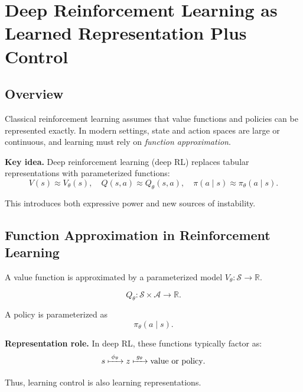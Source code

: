 \section{Deep Reinforcement Learning as Learned Representation Plus Control}

\subsection{Overview}

Classical reinforcement learning assumes that value functions and policies can be represented exactly.  
In modern settings, state and action spaces are large or continuous, and learning must rely on \emph{function approximation}.

\medskip

\noindent
\textbf{Key idea.}  
Deep reinforcement learning (deep RL) replaces tabular representations with parameterized functions:
\[
V(s) \approx V_\theta(s), \quad Q(s,a) \approx Q_\theta(s,a), \quad \pi(a \mid s) \approx \pi_\theta(a \mid s).
\]

\medskip

This introduces both expressive power and new sources of instability.

\subsection{Function Approximation in Reinforcement Learning}

\begin{definition}
A value function is approximated by a parameterized model $V_\theta : \mathcal{S} \to \mathbb{R}$.
\end{definition}

\begin{definition}
\[
Q_\theta : \mathcal{S} \times \mathcal{A} \to \mathbb{R}.
\]
\end{definition}

\begin{definition}
A policy is parameterized as
\[
\pi_\theta(a \mid s).
\]
\end{definition}

\medskip

\noindent
\textbf{Representation role.}  
In deep RL, these functions typically factor as:
\[
s \xmapsto{\;\phi_\theta\;} z \xmapsto{\;g_\theta\;} \text{value or policy}.
\]

Thus, learning control is also learning representations.

